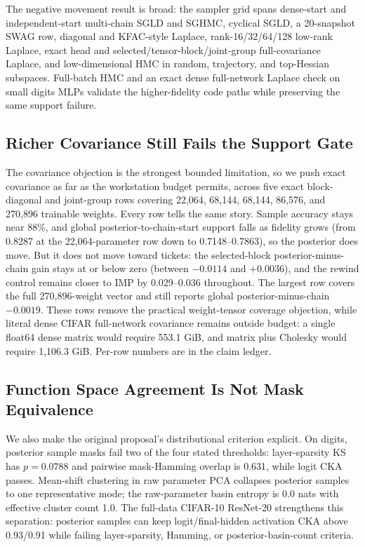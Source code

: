 \documentclass{article}
\begin{document}
The negative movement result is broad: the sampler grid spans dense-start and
independent-start multi-chain SGLD and SGHMC, cyclical SGLD, a 20-snapshot SWAG
row, diagonal and KFAC-style Laplace, rank-16/32/64/128 low-rank Laplace, exact
head and selected/tensor-block/joint-group full-covariance Laplace, and
low-dimensional HMC in random, trajectory, and top-Hessian subspaces. Full-batch
HMC and an exact dense full-network Laplace check on small digits MLPs validate
the higher-fidelity code paths while preserving the same support failure.

\subsection{Richer Covariance Still Fails the Support Gate}

The covariance objection is the strongest bounded limitation, so we push exact
covariance as far as the workstation budget permits, across five exact
block-diagonal and joint-group rows covering 22,064, 68,144, 68,144, 86,576,
and 270,896 trainable weights. Every row tells the same story. Sample accuracy
stays near 88\%, and global posterior-to-chain-start support falls as fidelity
grows (from 0.8287 at the 22,064-parameter row down to 0.7148--0.7863), so the
posterior does move. But it does not move toward tickets: the selected-block
posterior-minus-chain gain stays at or below zero (between $-0.0114$ and
$+0.0036$), and the rewind control remains closer to IMP by 0.029--0.036
throughout. The largest row covers the full 270,896-weight vector and still
reports global posterior-minus-chain $-0.0019$. These rows remove the practical
weight-tensor coverage objection, while literal dense CIFAR full-network
covariance remains outside budget: a single float64 dense matrix would require
553.1 GiB, and matrix plus Cholesky would require 1,106.3 GiB. Per-row numbers
are in the claim ledger.

\subsection{Function Space Agreement Is Not Mask Equivalence}

We also make the original proposal's distributional criterion explicit. On
digits, posterior sample masks fail two of the four stated thresholds:
layer-sparsity KS has $p=0.0788$ and pairwise mask-Hamming overlap is 0.631,
while logit CKA passes. Mean-shift clustering in raw parameter PCA collapses
posterior samples to one representative mode; the raw-parameter basin entropy is
0.0 nats with effective cluster count 1.0. The full-data CIFAR-10 ResNet-20
strengthens this separation: posterior samples can keep logit/final-hidden
activation CKA above 0.93/0.91 while failing layer-sparsity, Hamming, or
posterior-basin-count criteria.
\end{document}
